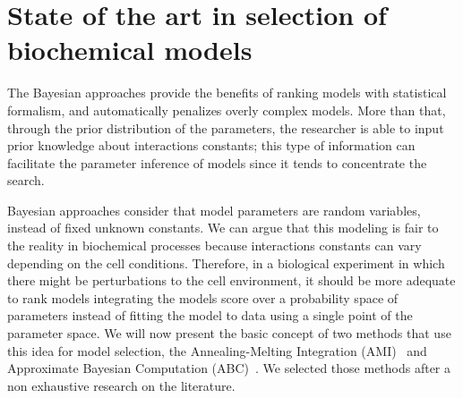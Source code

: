 \section{State of the art in selection of biochemical models}
The Bayesian approaches provide the benefits of ranking 
models with statistical formalism, and automatically penalizes overly 
complex models. More than that, through the prior distribution of the
parameters, the researcher is able to input prior knowledge about 
interactions constants; this type of information can facilitate the 
parameter inference of models since it tends to concentrate the search.

Bayesian approaches consider that model parameters are random variables, 
instead of fixed unknown constants. We can argue that this modeling is 
fair to the reality in biochemical processes because interactions 
constants can vary depending on the cell conditions. Therefore, in a 
biological experiment in which there might be perturbations to the cell 
environment, it should be more adequate to rank models integrating the 
models score over a probability space of parameters instead of fitting 
the model to data using a single point of the parameter space. We will 
now present the basic concept of two methods that use this idea for 
model selection, the Annealing-Melting Integration 
(AMI)~\cite{Vyshemirsky2007} and Approximate Bayesian Computation 
(ABC)~\cite{Toni2009}. We selected those methods after a non exhaustive
research on the literature.

